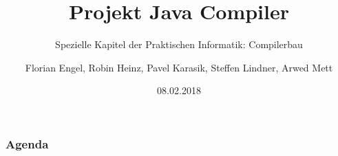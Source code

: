 \documentclass[aspectratio=169]{beamer}
\title{Projekt Java Compiler}
\subtitle{Spezielle Kapitel der Praktischen Informatik: Compilerbau}
\author{Florian Engel, Robin Heinz, Pavel Karasik, Steffen Lindner, Arwed Mett}
\institute{Universität Tübingen}
\date{08.02.2018}
\begin{document}
	\begin{frame}
		\titlepage
	\end{frame}

	\begin{frame}
		\frametitle{Agenda}
		\tableofcontents
	\end{frame}

	
	
	
	
	
	
	
	
	

\end{document}
